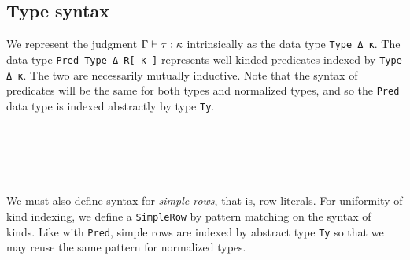 \documentclass[authoryear, acmsmall, screen, review, nonacm]{acmart}
\begin{document}
\subsection{Type syntax}

We represent the judgment $\Gamma \vdash \tau : \kappa$ intrinsically as the data type \verb!Type Δ κ!. The data type \verb!Pred Type Δ R[ κ ]! represents well-kinded predicates indexed by \verb!Type Δ κ!. The two are necessarily mutually inductive. Note that the syntax of predicates will be the same for both types and normalized types, and so the \verb!Pred! data type is indexed abstractly by type \verb!Ty!.

\begin{code}[hide]%
\>[0]\AgdaSpace{}%
\AgdaSpace{}%
\<%
\\
\>[0]\AgdaSpace{}%
\AgdaSpace{}%
\<%
\\
\>[0]\AgdaSpace{}%
\AgdaSpace{}%
\<%
\end{code}
\begin{code}%
\>[0]\AgdaSpace{}%
\AgdaSpace{}%
\AgdaSymbol{(}\AgdaSpace{}%
\AgdaSymbol{:}\AgdaSpace{}%
\AgdaSpace{}%
\AgdaSpace{}%
\AgdaSpace{}%
\AgdaSpace{}%
\AgdaSymbol{)}\AgdaSpace{}%
\AgdaSpace{}%
\AgdaSymbol{:}\AgdaSpace{}%
\AgdaSpace{}%
\AgdaSpace{}%
\<%
\\
\>[0]\AgdaSpace{}%
\AgdaSpace{}%
\AgdaSpace{}%
\AgdaSymbol{:}\AgdaSpace{}%
\AgdaSpace{}%
\AgdaSpace{}%
\<%
\end{code} 

We must also define syntax for \emph{simple rows}, that is, row literals. For uniformity of kind indexing, we define a \verb!SimpleRow! by pattern matching on the syntax of kinds. Like with \verb!Pred!, simple rows are indexed by abstract type \verb!Ty! so that we may reuse the same pattern for normalized types.
\end{document}
